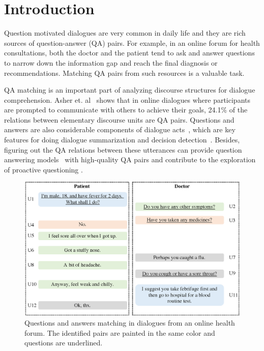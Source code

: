 \section{Introduction}
\label{sec:intro}
Question motivated dialogues are very common in daily life and 
they are rich sources of question-answer (QA) pairs. 
For example, in an online forum for health consultations, 
both the doctor and the patient tend to ask and answer questions to 
narrow down the information gap and reach the final diagnosis or 
recommendations. Matching QA pairs from such resources is a valuable task. 

QA matching is an important part of analyzing discourse structures 
for dialogue comprehension. Asher et. al~ 
shows that in online dialogues where participants are prompted to 
communicate with others to achieve their goals, 24.1\% of the relations 
between elementary discourse units are QA pairs. 
Questions and answers are also considerable components of 
dialogue acts~\cite{stolcke2000dialogue}, which are key features for 
doing dialogue summarization and 
decision detection~\cite{fernandez2008modelling}. 
Besides, figuring out the QA relations between these utterances can 
provide question answering 
models~\cite{ji2014information,vinyals2015neural,cui2017superagent} with 
high-quality QA pairs and contribute to the exploration of proactive questioning \cite{yan2017building}.

\begin{figure}[t]
	\centering
	\includegraphics[scale=0.28]{pictures/figure3.eps}
	\caption{Questions and answers matching in dialogues from an online health forum. The identified pairs are painted in the same color and questions are underlined.}
	\label{fig:sample}
\end{figure}

